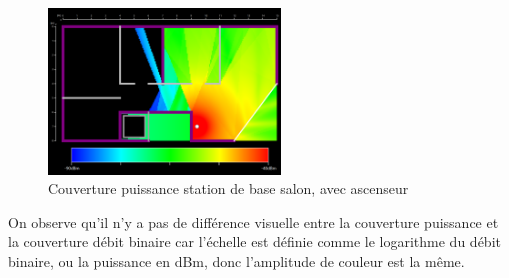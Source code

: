 \begin{figure}[H]
    \centering
    \includegraphics[width=0.55\textwidth]{latex/images/highres-with-lift-power.png}
    \caption{Couverture puissance station de base salon, avec ascenseur}
    \label{fig:simu-emplacement-defaut-avecasc-puissance}
\end{figure}

On observe qu'il n'y a pas de différence visuelle entre la couverture puissance et la couverture débit binaire
car l'échelle est définie comme le logarithme du débit binaire, ou la puissance en dBm, donc l'amplitude de couleur est la même.




%
%
%


